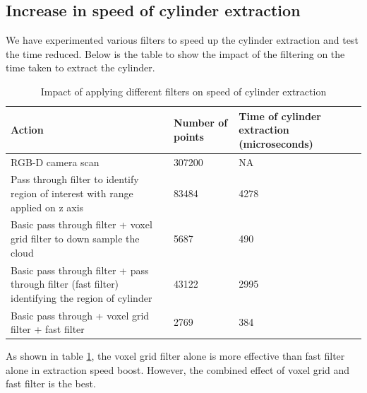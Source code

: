 \subsection{Increase in speed of cylinder extraction}
We have experimented various filters to speed up the cylinder extraction and test the time reduced. Below is the table to show the impact of the filtering on the time taken to extract the cylinder.
\begin{table}[h]
    \centering
    \begin{tabular}{|m{3cm}|m{1cm}|m{2cm}|}
        \hline
        Action & Number of points & Time of cylinder extraction (microseconds)  \\
         \hline
         RGB-D camera scan & 307200 & NA\\
         \hline
         Pass through filter to identify region of interest with range applied on z axis & 83484 & 4278 \\
         \hline
         Basic pass through filter + voxel grid filter to down sample the cloud & 5687 & 490\\
         \hline
         Basic pass through filter + pass through filter (fast filter) identifying the region of cylinder & 43122 & 2995\\
         \hline
         Basic pass through + voxel grid filter + fast filter & 2769 & 384\\
         \hline
    \end{tabular}
    \caption{Impact of applying different filters on speed of cylinder extraction}
    \label{tab:filters}
\end{table}

As shown in table \ref{tab:filters}, the voxel grid filter alone is more effective than fast filter alone in extraction speed boost. However, the combined effect of voxel grid and fast filter is the best.

